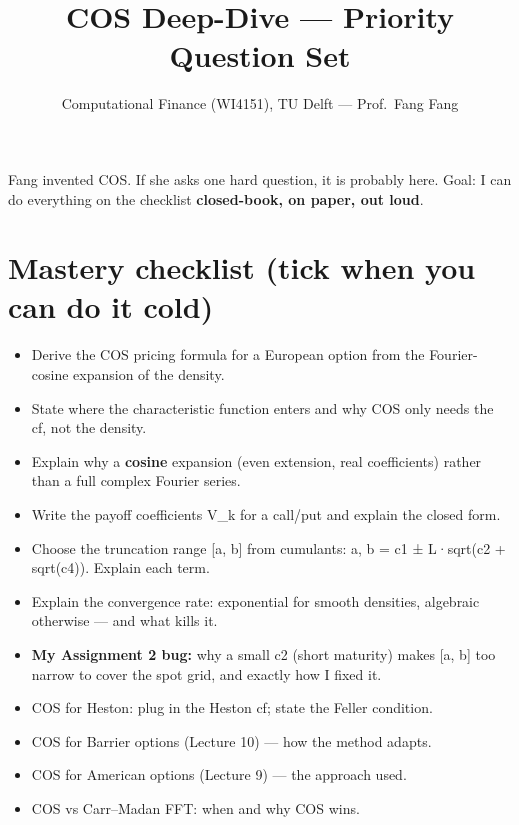 \documentclass[
  11pt,
]{article}
\title{COS Deep-Dive --- Priority Question Set}
\author{Computational Finance (WI4151), TU Delft --- Prof.~Fang Fang}
\date{}
\providecommand{\tightlist}{%
  \setlength{\itemsep}{0pt}\setlength{\parskip}{0pt}}
\begin{document}
\maketitle

{
\hypersetup{linkcolor=blue}
\setcounter{tocdepth}{3}
\tableofcontents
}
Fang invented COS. If she asks one hard question, it is probably here.
Goal: I can do everything on the checklist \textbf{closed-book, on
paper, out loud}.

\hypertarget{mastery-checklist-tick-when-you-can-do-it-cold}{%
\section{Mastery checklist (tick when you can do it
cold)}\label{mastery-checklist-tick-when-you-can-do-it-cold}}

\begin{itemize}
\tightlist
\item[$\square$]
  Derive the COS pricing formula for a European option from the
  Fourier-cosine expansion of the density.
\item[$\square$]
  State where the characteristic function enters and why COS only needs
  the cf, not the density.
\item[$\square$]
  Explain why a \textbf{cosine} expansion (even extension, real
  coefficients) rather than a full complex Fourier series.
\item[$\square$]
  Write the payoff coefficients V\_k for a call/put and explain the
  closed form.
\item[$\square$]
  Choose the truncation range {[}a, b{]} from cumulants: a, b = c1 ±
  L·sqrt(c2 + sqrt(c4)). Explain each term.
\item[$\square$]
  Explain the convergence rate: exponential for smooth densities,
  algebraic otherwise --- and what kills it.
\item[$\square$]
  \textbf{My Assignment 2 bug:} why a small c2 (short maturity) makes
  {[}a, b{]} too narrow to cover the spot grid, and exactly how I fixed
  it.
\item[$\square$]
  COS for Heston: plug in the Heston cf; state the Feller condition.
\item[$\square$]
  COS for Barrier options (Lecture 10) --- how the method adapts.
\item[$\square$]
  COS for American options (Lecture 9) --- the approach used.
\item[$\square$]
  COS vs Carr--Madan FFT: when and why COS wins.
\end{itemize}
\end{document}
